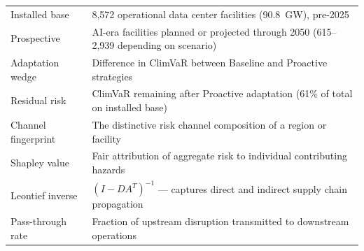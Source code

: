 \begin{tabular}{@{}p{3cm}p{11cm}@{}}
Installed base & 8{,}572 operational data center facilities (90.8~GW), pre-2025 \\
Prospective & AI-era facilities planned or projected through 2050 (615--2{,}939 depending on scenario) \\
Adaptation wedge & Difference in ClimVaR between Baseline and Proactive strategies \\
Residual risk & ClimVaR remaining after Proactive adaptation (61\% of total on installed base) \\
Channel fingerprint & The distinctive risk channel composition of a region or facility \\
Shapley value & Fair attribution of aggregate risk to individual contributing hazards \\
Leontief inverse & $(I - DA^T)^{-1}$ --- captures direct and indirect supply chain propagation \\
Pass-through rate & Fraction of upstream disruption transmitted to downstream operations \\
\end{tabular}